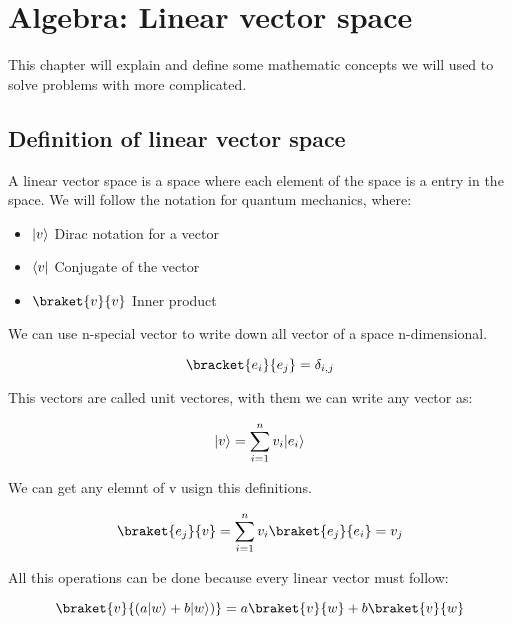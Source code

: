 \setchapterpreamble[u]{\margintoc}
\chapter{Algebra: Linear vector space}

This chapter will explain and define some mathematic concepts we will used to solve problems with more complicated.

\section{Definition of linear vector space}

A linear vector space is a space where each element of the space is a entry in the space. We will follow the notation for quantum mechanics, where:

\begin{itemize}
  \item $\lvert v\rangle$         Dirac notation for a vector
  \item $\langle v\rvert$         Conjugate of the vector
  \item $\braket{v}{v}$   Inner product
\end{itemize}

We can use n-special vector to write down all vector of a space n-dimensional.

\begin{equation}
  \label{6.1}
  \bracket{e_i}{e_j} = \delta_{i,j}
\end{equation}

This vectors are called unit vectores, with them we can write any vector as:

\begin{equation}
  \label{6.2}
  \lvert v\rangle = \sum_{i=1}^{n} v_i \lvert e_i\rangle
\end{equation}

We can get any elemnt of v usign this definitions.

\begin{equation}
  \label{6.3}
  \braket{e_j}{v} = \sum_{i=1}^{n} v_i \braket{e_j}{e_i} = v_j
\end{equation}

All this operations can be done because every linear vector must follow:

\begin{equation}
  \label{6.4}
  \braket{v}{(a\ket{w}+b\ket{w})} = a \braket{v}{w} + b\braket{v}{w}
\end{equation}

